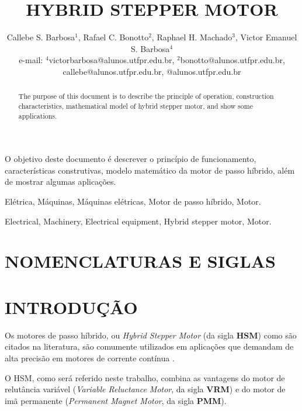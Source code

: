 \documentclass[portugues]{sobraep}
\title{HYBRID STEPPER MOTOR}
\author{Callebe S. Barbosa$^{1}$, Rafael C. Bonotto$^{2}$, Raphael H. Machado$^{3}$, Victor Emanuel S. Barbosa$^{4}$\\
	\normalsize e-mail: $^{4}$victorbarbosa@alunos.utfpr.edu.br, $^{2}$bonotto@alunos.utfpr.edu.br, callebe@alunos.utfpr.edu.br, @alunos.utfpr.edu.br
}
\begin{document}
\maketitle

\begin{resumo}
	O objetivo deste documento é descrever o princípio de funcionamento, características construtivas, modelo matemático da motor de passo híbrido, além de mostrar algumas aplicações.
\end{resumo}

\begin{palavraschave}
	Elétrica, Máquinas, Máquinas elétricas, Motor de passo híbrido, Motor.
\end{palavraschave}

\englishtitle

\begin{abstract}
	The purpose of this document is to describe the principle of operation, construction characteristics, mathematical model of hybrid stepper motor, and show some applications.
\end{abstract}

\begin{keywords}
	Electrical, Machinery, Electrical equipment, Hybrid stepper motor, Motor.
\end{keywords}

\section*{NOMENCLATURAS E SIGLAS}



\section{INTRODUÇÃO}
	
	Os motores de passo híbrido, ou \textit{Hybrid Stepper Motor} (da sigla \textbf{HSM}) como são citados na literatura, são comumente utilizados em aplicações que demandam de alta precisão em motores de corrente contínua \cite{ieeeRusso}.
	
	O HSM, como será referido neste trabalho, combina as vantagens do motor de relutância variável (\textit{Variable Reluctance Motor}, da sigla \textbf{VRM}) e do motor de imã permanente (\textit{Permanent Magnet Motor}, da sigla \textbf{PMM}). 
	
\end{document}
